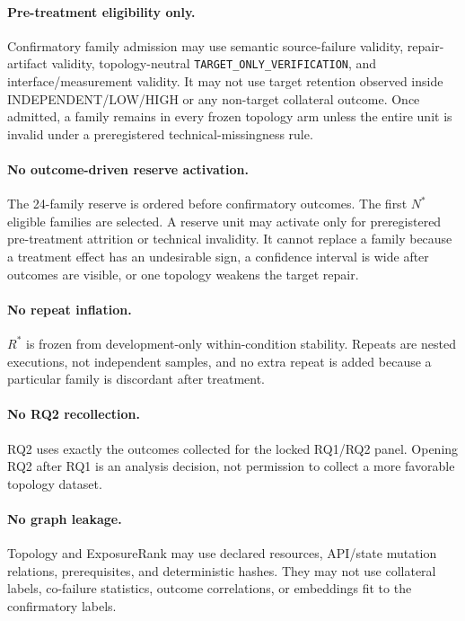 \documentclass{article}
\begin{document}
\paragraph{Pre-treatment eligibility only.}
Confirmatory family admission may use semantic source-failure validity, repair-artifact validity, topology-neutral \texttt{TARGET\_ONLY\_VERIFICATION}, and interface/measurement validity. It may not use target retention observed inside INDEPENDENT/LOW/HIGH or any non-target collateral outcome. Once admitted, a family remains in every frozen topology arm unless the entire unit is invalid under a preregistered technical-missingness rule.

\paragraph{No outcome-driven reserve activation.}
The 24-family reserve is ordered before confirmatory outcomes. The first $N^*$ eligible families are selected. A reserve unit may activate only for preregistered pre-treatment attrition or technical invalidity. It cannot replace a family because a treatment effect has an undesirable sign, a confidence interval is wide after outcomes are visible, or one topology weakens the target repair.

\paragraph{No repeat inflation.}
$R^*$ is frozen from development-only within-condition stability. Repeats are nested executions, not independent samples, and no extra repeat is added because a particular family is discordant after treatment.

\paragraph{No RQ2 recollection.}
RQ2 uses exactly the outcomes collected for the locked RQ1/RQ2 panel. Opening RQ2 after RQ1 is an analysis decision, not permission to collect a more favorable topology dataset.

\paragraph{No graph leakage.}
Topology and ExposureRank may use declared resources, API/state mutation relations, prerequisites, and deterministic hashes. They may not use collateral labels, co-failure statistics, outcome correlations, or embeddings fit to the confirmatory labels.
\end{document}
